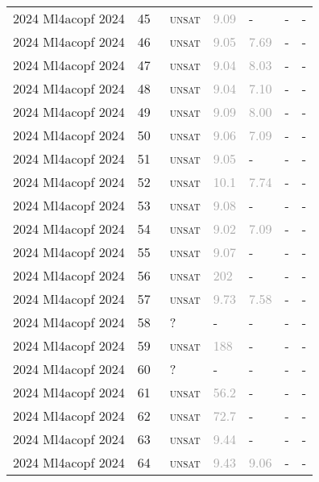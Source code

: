 \begin{center}
{\begin{longtable}{@{}lllllll@{}}
2024 Ml4acopf 2024 & 45 & ~\textsc{unsat} & \textcolor{darkgray}{9.09} & - & - & - \\
2024 Ml4acopf 2024 & 46 & ~\textsc{unsat} & \textcolor{darkgray}{9.05} & \textcolor{darkgray}{7.69} & - & - \\
2024 Ml4acopf 2024 & 47 & ~\textsc{unsat} & \textcolor{darkgray}{9.04} & \textcolor{darkgray}{8.03} & - & - \\
2024 Ml4acopf 2024 & 48 & ~\textsc{unsat} & \textcolor{darkgray}{9.04} & \textcolor{darkgray}{7.10} & - & - \\
2024 Ml4acopf 2024 & 49 & ~\textsc{unsat} & \textcolor{darkgray}{9.09} & \textcolor{darkgray}{8.00} & - & - \\
2024 Ml4acopf 2024 & 50 & ~\textsc{unsat} & \textcolor{darkgray}{9.06} & \textcolor{darkgray}{7.09} & - & - \\
2024 Ml4acopf 2024 & 51 & ~\textsc{unsat} & \textcolor{darkgray}{9.05} & - & - & - \\
2024 Ml4acopf 2024 & 52 & ~\textsc{unsat} & \textcolor{darkgray}{10.1} & \textcolor{darkgray}{7.74} & - & - \\
2024 Ml4acopf 2024 & 53 & ~\textsc{unsat} & \textcolor{darkgray}{9.08} & - & - & - \\
2024 Ml4acopf 2024 & 54 & ~\textsc{unsat} & \textcolor{darkgray}{9.02} & \textcolor{darkgray}{7.09} & - & - \\
2024 Ml4acopf 2024 & 55 & ~\textsc{unsat} & \textcolor{darkgray}{9.07} & - & - & - \\
2024 Ml4acopf 2024 & 56 & ~\textsc{unsat} & \textcolor{darkgray}{202} & - & - & - \\
2024 Ml4acopf 2024 & 57 & ~\textsc{unsat} & \textcolor{darkgray}{9.73} & \textcolor{darkgray}{7.58} & - & - \\
2024 Ml4acopf 2024 & 58 & ~? & - & - & - & - \\
2024 Ml4acopf 2024 & 59 & ~\textsc{unsat} & \textcolor{darkgray}{188} & - & - & - \\
2024 Ml4acopf 2024 & 60 & ~? & - & - & - & - \\
2024 Ml4acopf 2024 & 61 & ~\textsc{unsat} & \textcolor{darkgray}{56.2} & - & - & - \\
2024 Ml4acopf 2024 & 62 & ~\textsc{unsat} & \textcolor{darkgray}{72.7} & - & - & - \\
2024 Ml4acopf 2024 & 63 & ~\textsc{unsat} & \textcolor{darkgray}{9.44} & - & - & - \\
2024 Ml4acopf 2024 & 64 & ~\textsc{unsat} & \textcolor{darkgray}{9.43} & \textcolor{darkgray}{9.06} & - & - \\

\end{longtable}}
\end{center}
